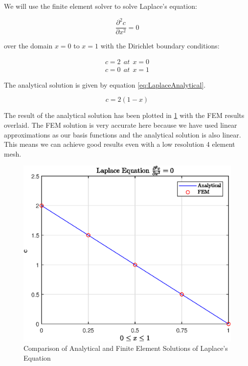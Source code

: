 \documentclass[11pt]{article}
\begin{document}
We will use the finite element solver to solve Laplace's equation: 

\begin{equation}
\label{eq:Laplace}
\frac{\partial^2 c}{\partial x^2} = 0
\end{equation}

over the domain $x = 0$ to $x = 1$ with the Dirichlet boundary conditions:

\begin{subequations}\label{eq:LaplaceBCs}
\begin{align}
c = 2 \ \ at \ \ x = 0 \\
c = 0 \ \ at \ \ x  = 1
\end{align}
\end{subequations}

The analytical solution is given by equation \ref{eq:LaplaceAnalytical}.

\begin{equation}\label{eq:LaplaceAnalytical}
c = 2(1-x)
\end{equation}

The result of the analytical solution has been plotted in \ref{fig:LaplaceFig1} with the FEM results overlaid. The FEM solution is very accurate here because we have used linear approximations as our basis functions and the analytical solution is also linear. This means we can achieve good results even with a low resolution 4 element mesh.

\begin{figure}[h!] \label{fig:LaplaceFig1}
    \centering
    \includegraphics{epsLaplaceFig1}
    \caption{Comparison of Analytical and Finite Element Solutions of Laplace's Equation}
\end{figure}
\end{document}
